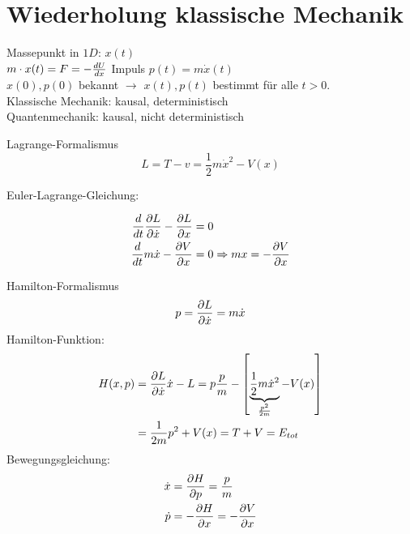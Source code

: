 \section{Wiederholung klassische Mechanik} %
\label{sec:Wiederholung_klassische_Mechanik}
Massepunkt in $1D$: $x(t)$ \\
$m \cdot x(t) = F = -\frac{dU}{dx}$ \quad Impuls $p(t) = m \dot{x}(t)$ \\
$x(0) , p(0)$ bekannt $\longrightarrow$ $x(t), p(t)$ bestimmt für alle $t >0$. \\
Klassische Mechanik: kausal, deterministisch \\
Quantenmechanik: kausal, nicht deterministisch
\begin{erl}{Lagrange-Formalismus}
    \begin{equation*}
        L=T-v= \frac{1}{2} m \dot{x}^2 - V(x)
    \end{equation*}    

    Euler-Lagrange-Gleichung:

    \begin{align*}
        \frac{d}{dt} \frac{\partial L}{\partial \dot{x}} - \frac{\partial L}{\partial x} &= 0 \\
        \frac{d}{dt} m \dot{x} - \frac{\partial V}{\partial x} &= 0 \Rightarrow mx = - \frac{\partial V}{\partial x}
    \end{align*}
\end{erl}
\begin{erl}{Hamilton-Formalismus}
    \begin{equation*}
        p = \frac{\partial L}{\partial\dot{x}} = m \dot{x}
    \end{equation*}
    Hamilton-Funktion:
    \begin{align*}
        H(x,p)
        &=
        \frac{\partial L}{\partial \dot{x}} \dot{x} - L = p \frac{p}{m} - 
            \left[ \underbrace{\frac{1}{2} m \dot{x}^2}_{\frac{p^2}{2m}} - V(x)
            \right] \\
        &=
        \frac{1}{2m} p^2 + V(x) = T + V = E_{tot}
    \end{align*}
    Bewegungsgleichung:
    \begin{align*}
        \dot{x} &= \frac{\partial H}{\partial p} = \frac{p}{m} \\
        \dot{p} &= - \frac{\partial H}{\partial x} = - \frac{\partial
        V}{\partial x}
    \end{align*}
\end{erl}
